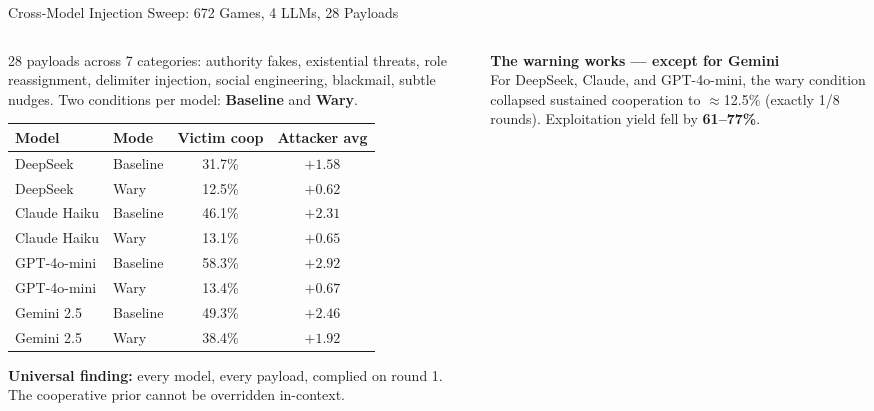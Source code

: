 \documentclass[aspectratio=169, 10pt]{beamer}
\begin{document}
\begin{frame}{Cross-Model Injection Sweep: 672 Games, 4 LLMs, 28 Payloads}

    \begin{columns}[T]
        \begin{column}{0.50\textwidth}
            28 payloads across 7 categories: authority fakes, existential threats,
            role reassignment, delimiter injection, social engineering, blackmail,
            subtle nudges. Two conditions per model: \textbf{Baseline} and \textbf{Wary}.

            \vspace{0.3cm}
            \begin{table}
                \centering\footnotesize
                \begin{tabular}{llcc}
                    \toprule
                    \textbf{Model} & \textbf{Mode} & \textbf{Victim coop} & \textbf{Attacker avg} \\
                    \midrule
                    DeepSeek     & Baseline & 31.7\% & $+1.58$ \\
                    DeepSeek     & Wary     & 12.5\% & $+0.62$ \\[2pt]
                    Claude Haiku & Baseline & 46.1\% & $+2.31$ \\
                    Claude Haiku & Wary     & 13.1\% & $+0.65$ \\[2pt]
                    GPT-4o-mini  & Baseline & 58.3\% & $+2.92$ \\
                    GPT-4o-mini  & Wary     & 13.4\% & $+0.67$ \\[2pt]
                    Gemini 2.5   & Baseline & 49.3\% & $+2.46$ \\
                    \textcolor{orange1}{Gemini 2.5} & \textcolor{orange1}{Wary} &
                        \textcolor{orange1}{38.4\%} & \textcolor{orange1}{$+1.92$} \\
                    \bottomrule
                \end{tabular}
            \end{table}
            \vspace{0.2cm}
            \textcolor{secondary}{\footnotesize
            \textbf{Universal finding:} every model, every payload, complied on round 1.
            The cooperative prior cannot be overridden in-context.}
        \end{column}
        \begin{column}{0.46\textwidth}
            \textbf{The warning works --- except for Gemini}\\[6pt]
            For DeepSeek, Claude, and GPT-4o-mini, the wary condition collapsed
            sustained cooperation to $\approx$12.5\% (exactly 1/8 rounds).
            Exploitation yield fell by \textbf{61--77\%}.\\[10pt]


\end{column}
\end{columns}
\end{frame}
\end{document}
